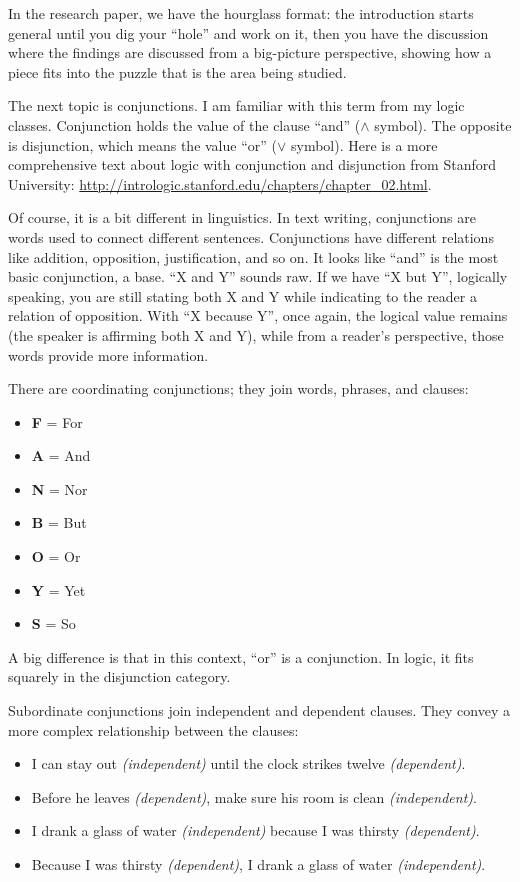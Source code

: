 In the research paper, we have the hourglass format: the introduction starts general until you dig your ``hole'' and work on it, then you have the discussion where the findings are discussed from a big-picture perspective, showing how a piece fits into the puzzle that is the area being studied.

The next topic is conjunctions. I am familiar with this term from my logic classes. Conjunction holds the value of the clause ``and'' ($\land$ symbol). The opposite is disjunction, which means the value ``or'' ($\lor$ symbol). \sloppy Here is a more comprehensive text about logic with conjunction and disjunction from Stanford University: \url{http://intrologic.stanford.edu/chapters/chapter_02.html}.\fussy

Of course, it is a bit different in linguistics. In text writing, conjunctions are words used to connect different sentences. Conjunctions have different relations like addition, opposition, justification, and so on. It looks like ``and'' is the most basic conjunction, a base. ``X and Y'' sounds raw. If we have ``X but Y'', logically speaking, you are still stating both X and Y while indicating to the reader a relation of opposition. With ``X because Y'', once again, the logical value remains (the speaker is affirming both X and Y), while from a reader's perspective, those words provide more information.

There are coordinating conjunctions; they join words, phrases, and clauses:
\begin{itemize}
    \item \textbf{F} = For
    \item \textbf{A} = And
    \item \textbf{N} = Nor
    \item \textbf{B} = But
    \item \textbf{O} = Or
    \item \textbf{Y} = Yet
    \item \textbf{S} = So
\end{itemize}

A big difference is that in this context, ``or'' is a conjunction. In logic, it fits squarely in the disjunction category.

Subordinate conjunctions join independent and dependent clauses. They convey a more complex relationship between the clauses:
\begin{itemize}
    \item I can stay out \textit{(independent)} until the clock strikes twelve \textit{(dependent)}.
    \item Before he leaves \textit{(dependent)}, make sure his room is clean \textit{(independent)}.
    \item I drank a glass of water \textit{(independent)} because I was thirsty \textit{(dependent)}.
    \item Because I was thirsty \textit{(dependent)}, I drank a glass of water \textit{(independent)}.
\end{itemize}


